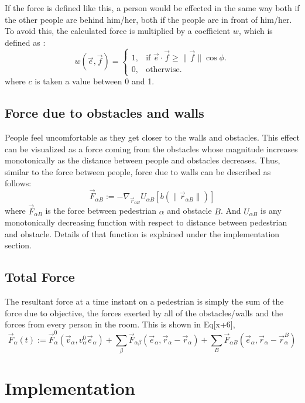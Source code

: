 \documentclass[11pt]{article}
\begin{document}
If the force is defined like this, a person would be effected in the same way both if the other people are behind him/her, both if the people are in front of him/her. To avoid this, the calculated force is multiplied by a coefficient $w$, which is defined as : 
\begin{equation}
    w(\vec{e},\vec{f})=\begin{cases}
    1, & \text{if $\vec{e}\cdot\vec{f}\geq\|\vec{f}\|\cos{\phi}$}.\\
    0, & \text{otherwise}.
  \end{cases}
\end{equation}
where $c$ is taken a value between 0 and 1.

\subsection{Force due to obstacles and walls}
People feel uncomfortable as they get closer to the walls and obstacles. This effect can be visualized as a force coming from the obstacles whose magnitude increases monotonically as the distance between people and obstacles decreases. Thus, similar to the force between people, force due to walls can be described as follows:
\begin{equation}
    \vec{F}_{\alpha B}:=-\nabla_{\vec{r}_{\alpha B}}U_{\alpha B}[b(\|\vec{r}_{\alpha B}\|)]
\end{equation}
where $ \vec{F}_{\alpha B}$ is the force between pedestrian $\alpha$ and obstacle $B$. And $U_{\alpha B}$ is any monotonically decreasing function with respect to distance between pedestrian and obstacle. Details of that function is explained under the implementation section.

\subsection{Total Force}
The resultant force at a time instant on a pedestrian is simply the sum of the force due to objective, the forces exerted by all of the obstacles/walls and the forces from every person in the room. This is shown in Eq[x+6],
\begin{equation}
    \vec{F}_\alpha(t):=\vec{F}_\alpha^0(\vec{v}_\alpha,v_\alpha^0\vec{e}_\alpha)+\sum_\beta\vec{F}_{\alpha\beta}(\vec{e}_\alpha,\vec{r}_\alpha-\vec{r}_\alpha)+\sum_B\vec{F}_{\alpha B}(\vec{e}_\alpha,\vec{r}_\alpha-\vec{r}_\alpha^B)
\end{equation}

\section{Implementation}
\end{document}
